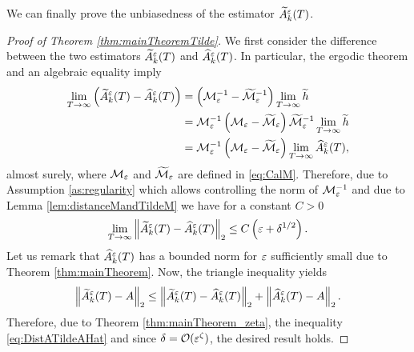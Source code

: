 \documentclass[10pt]{article}
\begin{document}
\begin{appendices}
We can finally prove the unbiasedness of the estimator $\widetilde A^\varepsilon_k(T)$.

\begin{proof}[Proof of Theorem \ref{thm:mainTheoremTilde}] We first consider the difference between the two estimators $\widetilde A^\varepsilon_k(T)$ and $\widehat A^\varepsilon_k(T)$. In particular, the ergodic theorem and an algebraic equality imply
	\begin{equation}
	\begin{aligned}
	\lim_{T \to \infty} \left(\widetilde A^\varepsilon_k(T) - \widehat A^\varepsilon_k(T)\right) &= \left(\mathcal M_\varepsilon^{-1} - \widetilde{\mathcal M}_\varepsilon^{-1}\right) \lim_{T \to \infty}\widetilde h \\
	&= \mathcal M_\varepsilon^{-1}\left(\mathcal M_\varepsilon - \widetilde{\mathcal M}_\varepsilon\right)  \widetilde{\mathcal M}_\varepsilon^{-1} \lim_{T \to \infty} \widetilde h\\
	&= \mathcal M_\varepsilon^{-1}\left(\mathcal M_\varepsilon - \widetilde{\mathcal M}_\varepsilon\right)\lim_{T \to \infty} \widehat A^\varepsilon_k(T),
	\end{aligned}
	\end{equation}
	almost surely, where $\mathcal M_\varepsilon$ and $\widetilde{\mathcal M}_\varepsilon$ are defined in \eqref{eq:CalM}. Therefore, due to Assumption \ref{as:regularity} which allows controlling the norm of $\mathcal M_\varepsilon^{-1}$ and due to Lemma \ref{lem:distanceMandTildeM} we have for a constant $C > 0$
	\begin{equation}\label{eq:DistATildeAHat}
	\lim_{T \to \infty} \left\|\widetilde A^\varepsilon_k(T) - \widehat A^\varepsilon_k(T)\right\|_2 \leq C \left(\varepsilon + \delta^{1/2} \right).
	\end{equation}
	Let us remark that $\widehat A^\varepsilon_k(T)$ has a bounded norm for $\varepsilon$ sufficiently small due to Theorem \ref{thm:mainTheorem}. Now, the triangle inequality yields
	\begin{equation}
	\left\|\widetilde A^\varepsilon_k(T) - A\right\|_2 \leq \left\|\widetilde A^\varepsilon_k(T) - \widehat A^\varepsilon_k(T)\right\|_2 + \left\|\widehat A^\varepsilon_k(T) - A\right\|_2.
	\end{equation}
	Therefore, due to Theorem \ref{thm:mainTheorem_zeta}, the inequality \eqref{eq:DistATildeAHat} and since $\delta = \mathcal O(\varepsilon^\zeta)$, the desired result holds.
\end{proof}

\end{appendices}




\end{document}
